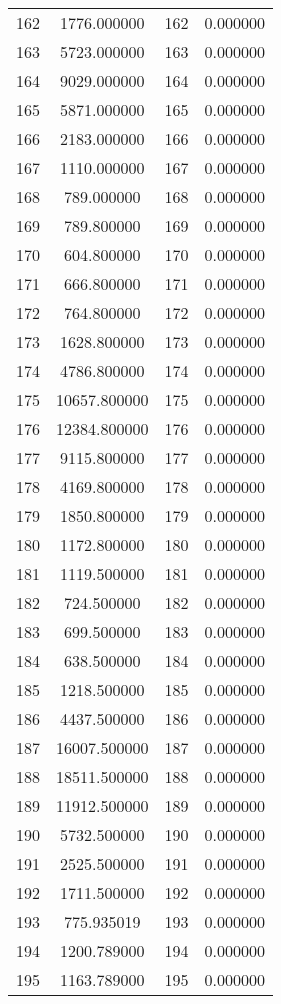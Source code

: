 \documentclass[12pt]{article}
\begin{document}
\begin{longtable}{@{}cccc@{}}
162 & 1776.000000 & 162 & 0.000000 \\
163 & 5723.000000 & 163 & 0.000000 \\
164 & 9029.000000 & 164 & 0.000000 \\
165 & 5871.000000 & 165 & 0.000000 \\
166 & 2183.000000 & 166 & 0.000000 \\
167 & 1110.000000 & 167 & 0.000000 \\
168 & 789.000000 & 168 & 0.000000 \\
169 & 789.800000 & 169 & 0.000000 \\
170 & 604.800000 & 170 & 0.000000 \\
171 & 666.800000 & 171 & 0.000000 \\
172 & 764.800000 & 172 & 0.000000 \\
173 & 1628.800000 & 173 & 0.000000 \\
174 & 4786.800000 & 174 & 0.000000 \\
175 & 10657.800000 & 175 & 0.000000 \\
176 & 12384.800000 & 176 & 0.000000 \\
177 & 9115.800000 & 177 & 0.000000 \\
178 & 4169.800000 & 178 & 0.000000 \\
179 & 1850.800000 & 179 & 0.000000 \\
180 & 1172.800000 & 180 & 0.000000 \\
181 & 1119.500000 & 181 & 0.000000 \\
182 & 724.500000 & 182 & 0.000000 \\
183 & 699.500000 & 183 & 0.000000 \\
184 & 638.500000 & 184 & 0.000000 \\
185 & 1218.500000 & 185 & 0.000000 \\
186 & 4437.500000 & 186 & 0.000000 \\
187 & 16007.500000 & 187 & 0.000000 \\
188 & 18511.500000 & 188 & 0.000000 \\
189 & 11912.500000 & 189 & 0.000000 \\
190 & 5732.500000 & 190 & 0.000000 \\
191 & 2525.500000 & 191 & 0.000000 \\
192 & 1711.500000 & 192 & 0.000000 \\
193 & 775.935019 & 193 & 0.000000 \\
194 & 1200.789000 & 194 & 0.000000 \\
195 & 1163.789000 & 195 & 0.000000 \\

\end{longtable}
\end{document}
